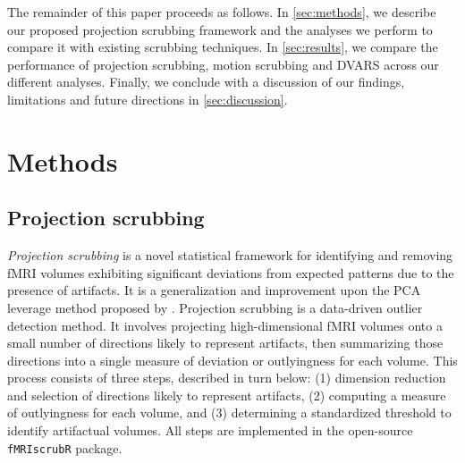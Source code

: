 \documentclass{article}
\newcommand{\R}{\texttt{R}\xspace}
\newcommand{\fMRIscrub}{\texttt{fMRIscrub}\xspace}
\begin{document}

The remainder of this paper proceeds as follows.  In \autoref{sec:methods}, we describe our proposed projection scrubbing framework and the analyses we perform to compare it with existing scrubbing techniques. In \autoref{sec:results}, we compare the performance of projection scrubbing, motion scrubbing and DVARS across our different analyses. Finally, we conclude with a discussion of our findings, limitations and future directions in \autoref{sec:discussion}.


\section{Methods}
\label{sec:methods}

\subsection{Projection scrubbing}

\textit{Projection scrubbing} is a novel statistical framework for identifying and removing fMRI volumes exhibiting significant deviations from expected patterns due to the presence of artifacts. It is a generalization and improvement upon the PCA leverage method proposed by \cite{mejiaPCALeverageOutlier2017}. Projection scrubbing is a data-driven outlier detection method. It involves projecting high-dimensional fMRI volumes onto a small number of directions likely to represent artifacts, then summarizing those directions into a single measure of deviation or outlyingness for each volume. This process consists of three steps, described in turn below: (1) dimension reduction and selection of directions likely to represent artifacts, (2) computing a measure of outlyingness for each volume, and (3) determining a standardized threshold to identify artifactual volumes. All steps are implemented in the open-source \fMRIscrub \R package. 
\end{document}
